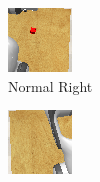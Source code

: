 \begin{figure}[htpb]
\begin{subfigure}{0.2\linewidth}
    \includegraphics[width=\linewidth]{assets/depth-interfacing/normal-r_rgb.png}
    \caption{Normal Right}\label{subfig:normal-r-shoulder}
  \end{subfigure}
  \begin{subfigure}{0.2\linewidth}
    \centering
    \includegraphics[width=\linewidth]{assets/depth-interfacing/smaller-l_rgb.png}

\end{subfigure}
\end{figure}
